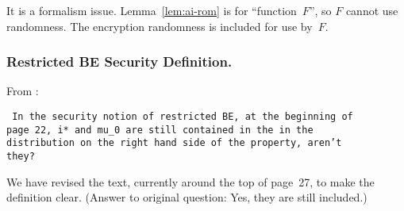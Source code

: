 It is a formalism issue.
Lemma~\ref{lem:ai-rom} is for ``function~$F$'',
so $F$ cannot use randomness.
The encryption randomness is included for use by~$F$.

\subsubsection{Restricted BE Security Definition.}
From :

\texttt{
In the security notion of restricted BE, at the beginning of \\
page 22, i* and mu\_0 are still contained in the {\string\cdots} in the \\
distribution on the right hand side of the {\string\approx} property, aren't \\
they?
}

We have revised the text, currently around the top of page~27,
to make the definition clear.
(Answer to original question: Yes, they are still included.)
